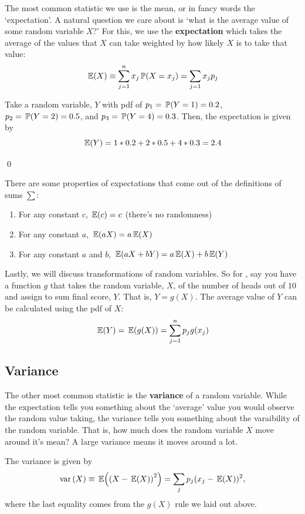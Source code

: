 \documentclass[12pt]{article}
\begin{document}
The most common statistic we use is the mean, or in fancy words the `expectation'. A natural question we care about is `what is the average value of some random variable $X$?' For this, we use the \textbf{expectation} which takes the average of the values that $X$ can take weighted by how likely $X$ is to take that value:
$$
  \expec{X} \equiv \sum_{j=1}^n x_j \P(X = x_j) = \sum_{j=1} x_j p_j
$$

\begin{example}
  Take a random variable, $Y$ with pdf of $p_1 = \P{Y = 1} = 0.2$, $p_2 = \P{Y = 2} = 0.5$, and $p_3 = \P{Y = 4} = 0.3$. Then, the expectation is given by
  $$
    \expec{Y} = 1 * 0.2 + 2 * 0.5 + 4 * 0.3 = 2.4
  $$
  
  \qed
\end{example}

There are some properties of expectations that come out of the definitions of sums $\sum$:
\begin{enumerate}
  \item For any constant $c$, $\expec{c} = c$ (there's no randomness)
  \item For any constant $a$, $\expec{aX} = a \expec{X}$
  \item For any constant $a$ and $b$, $\expec{aX + bY} = a \expec{X} + b \expec{Y}$
\end{enumerate}

Lastly, we will discuss transformations of random variables. So for , say you have a function $g$ that takes the random variable, $X$, of the number of heads out of $10$ and assign to sum final score, $Y$. That is, $Y = g(X)$. The average value of $Y$ can be calculated using the pdf of $X$:
$$
  \expec{Y} = \expec{g(X)} = \sum_{j=1}^n p_j g(x_j)
$$

\subsection*{Variance}

The other most common statistic is the \textbf{variance} of a random variable. While the expectation tells you something about the `average' value you would observe the random value taking, the variance tells you something about the varaibility of the random variable. That is, how much does the random variable $X$ move around it's mean? A large variance means it moves around a lot.

The variance is given by 
$$
  \var{X} \equiv \expec{\left( X - \expec{X} \right)^2 } = \sum_j p_j (x_j - \expec{X})^2,
$$
where the last equality comes from the $g(X)$ rule we laid out above. 
\end{document}
